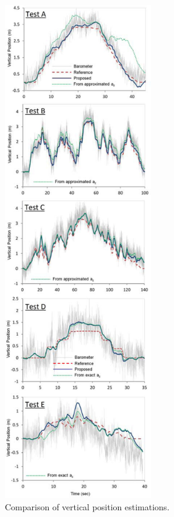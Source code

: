 \documentclass[10pt,journal,compsoc]{IEEEtran}
\begin{document}
\begin{figure}[!t]
\centering
\includegraphics[width=2.5in]{fig4}
\caption{Comparison of vertical position estimations.}
\label{fig4}
\end{figure}
\end{document}

